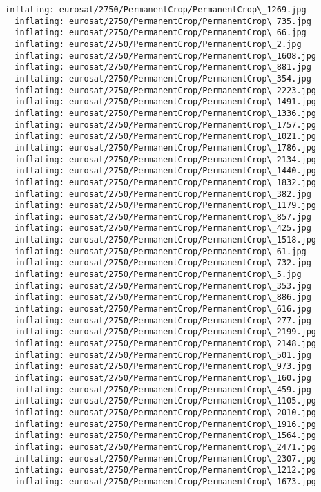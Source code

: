 \documentclass[11pt]{article}
\begin{document}
\begin{Verbatim}[commandchars=\\\{\}]
  inflating: eurosat/2750/PermanentCrop/PermanentCrop\_1269.jpg
  inflating: eurosat/2750/PermanentCrop/PermanentCrop\_735.jpg
  inflating: eurosat/2750/PermanentCrop/PermanentCrop\_66.jpg
  inflating: eurosat/2750/PermanentCrop/PermanentCrop\_2.jpg
  inflating: eurosat/2750/PermanentCrop/PermanentCrop\_1608.jpg
  inflating: eurosat/2750/PermanentCrop/PermanentCrop\_881.jpg
  inflating: eurosat/2750/PermanentCrop/PermanentCrop\_354.jpg
  inflating: eurosat/2750/PermanentCrop/PermanentCrop\_2223.jpg
  inflating: eurosat/2750/PermanentCrop/PermanentCrop\_1491.jpg
  inflating: eurosat/2750/PermanentCrop/PermanentCrop\_1336.jpg
  inflating: eurosat/2750/PermanentCrop/PermanentCrop\_1757.jpg
  inflating: eurosat/2750/PermanentCrop/PermanentCrop\_1021.jpg
  inflating: eurosat/2750/PermanentCrop/PermanentCrop\_1786.jpg
  inflating: eurosat/2750/PermanentCrop/PermanentCrop\_2134.jpg
  inflating: eurosat/2750/PermanentCrop/PermanentCrop\_1440.jpg
  inflating: eurosat/2750/PermanentCrop/PermanentCrop\_1832.jpg
  inflating: eurosat/2750/PermanentCrop/PermanentCrop\_382.jpg
  inflating: eurosat/2750/PermanentCrop/PermanentCrop\_1179.jpg
  inflating: eurosat/2750/PermanentCrop/PermanentCrop\_857.jpg
  inflating: eurosat/2750/PermanentCrop/PermanentCrop\_425.jpg
  inflating: eurosat/2750/PermanentCrop/PermanentCrop\_1518.jpg
  inflating: eurosat/2750/PermanentCrop/PermanentCrop\_61.jpg
  inflating: eurosat/2750/PermanentCrop/PermanentCrop\_732.jpg
  inflating: eurosat/2750/PermanentCrop/PermanentCrop\_5.jpg
  inflating: eurosat/2750/PermanentCrop/PermanentCrop\_353.jpg
  inflating: eurosat/2750/PermanentCrop/PermanentCrop\_886.jpg
  inflating: eurosat/2750/PermanentCrop/PermanentCrop\_616.jpg
  inflating: eurosat/2750/PermanentCrop/PermanentCrop\_277.jpg
  inflating: eurosat/2750/PermanentCrop/PermanentCrop\_2199.jpg
  inflating: eurosat/2750/PermanentCrop/PermanentCrop\_2148.jpg
  inflating: eurosat/2750/PermanentCrop/PermanentCrop\_501.jpg
  inflating: eurosat/2750/PermanentCrop/PermanentCrop\_973.jpg
  inflating: eurosat/2750/PermanentCrop/PermanentCrop\_160.jpg
  inflating: eurosat/2750/PermanentCrop/PermanentCrop\_459.jpg
  inflating: eurosat/2750/PermanentCrop/PermanentCrop\_1105.jpg
  inflating: eurosat/2750/PermanentCrop/PermanentCrop\_2010.jpg
  inflating: eurosat/2750/PermanentCrop/PermanentCrop\_1916.jpg
  inflating: eurosat/2750/PermanentCrop/PermanentCrop\_1564.jpg
  inflating: eurosat/2750/PermanentCrop/PermanentCrop\_2471.jpg
  inflating: eurosat/2750/PermanentCrop/PermanentCrop\_2307.jpg
  inflating: eurosat/2750/PermanentCrop/PermanentCrop\_1212.jpg
  inflating: eurosat/2750/PermanentCrop/PermanentCrop\_1673.jpg

\end{Verbatim}
\end{document}
